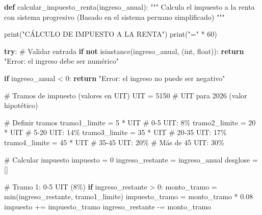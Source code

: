 \documentclass[
  doc,
  floatsintext,
  longtable,
  a4paper,
  nolmodern,
  notxfonts,
  notimes,
  12pt,
  colorlinks=true,linkcolor=blue,citecolor=blue,urlcolor=blue]{apa7}
\newenvironment{Shaded}{\begin{snugshade}}{\end{snugshade}}
\newcommand{\BuiltInTok}[1]{\textcolor[rgb]{0.00,0.23,0.31}{#1}}
\newcommand{\CommentTok}[1]{\textcolor[rgb]{0.37,0.37,0.37}{#1}}
\newcommand{\ControlFlowTok}[1]{\textcolor[rgb]{0.00,0.23,0.31}{\textbf{#1}}}
\newcommand{\DecValTok}[1]{\textcolor[rgb]{0.68,0.00,0.00}{#1}}
\newcommand{\FloatTok}[1]{\textcolor[rgb]{0.68,0.00,0.00}{#1}}
\newcommand{\KeywordTok}[1]{\textcolor[rgb]{0.00,0.23,0.31}{\textbf{#1}}}
\newcommand{\NormalTok}[1]{\textcolor[rgb]{0.00,0.23,0.31}{#1}}
\newcommand{\OperatorTok}[1]{\textcolor[rgb]{0.37,0.37,0.37}{#1}}
\newcommand{\StringTok}[1]{\textcolor[rgb]{0.13,0.47,0.30}{#1}}
\begin{document}
\begin{Shaded}
\begin{Highlighting}[]
\KeywordTok{def}\NormalTok{ calcular\_impuesto\_renta(ingreso\_anual):}
    \CommentTok{"""}
\CommentTok{    Calcula el impuesto a la renta con sistema progresivo}
\CommentTok{    (Basado en el sistema peruano simplificado)}
\CommentTok{    """}
    
    \BuiltInTok{print}\NormalTok{(}\StringTok{"CÁLCULO DE IMPUESTO A LA RENTA"}\NormalTok{)}
    \BuiltInTok{print}\NormalTok{(}\StringTok{"="} \OperatorTok{*} \DecValTok{60}\NormalTok{)}
    
    \ControlFlowTok{try}\NormalTok{:}
        \CommentTok{\# Validar entrada}
        \ControlFlowTok{if} \KeywordTok{not} \BuiltInTok{isinstance}\NormalTok{(ingreso\_anual, (}\BuiltInTok{int}\NormalTok{, }\BuiltInTok{float}\NormalTok{)):}
            \ControlFlowTok{return} \StringTok{"Error: el ingreso debe ser numérico"}
        
        \ControlFlowTok{if}\NormalTok{ ingreso\_anual }\OperatorTok{\textless{}} \DecValTok{0}\NormalTok{:}
            \ControlFlowTok{return} \StringTok{"Error: el ingreso no puede ser negativo"}
        
        \CommentTok{\# Tramos de impuesto (valores en UIT)}
\NormalTok{        UIT }\OperatorTok{=} \DecValTok{5150}  \CommentTok{\# UIT para 2026 (valor hipotético)}
        
        \CommentTok{\# Definir tramos}
\NormalTok{        tramo1\_limite }\OperatorTok{=} \DecValTok{5} \OperatorTok{*}\NormalTok{ UIT      }\CommentTok{\# 0{-}5 UIT: 8\%}
\NormalTok{        tramo2\_limite }\OperatorTok{=} \DecValTok{20} \OperatorTok{*}\NormalTok{ UIT     }\CommentTok{\# 5{-}20 UIT: 14\%}
\NormalTok{        tramo3\_limite }\OperatorTok{=} \DecValTok{35} \OperatorTok{*}\NormalTok{ UIT     }\CommentTok{\# 20{-}35 UIT: 17\%}
\NormalTok{        tramo4\_limite }\OperatorTok{=} \DecValTok{45} \OperatorTok{*}\NormalTok{ UIT     }\CommentTok{\# 35{-}45 UIT: 20\%}
        \CommentTok{\# Más de 45 UIT: 30\%}
        
        \CommentTok{\# Calcular impuesto}
\NormalTok{        impuesto }\OperatorTok{=} \DecValTok{0}
\NormalTok{        ingreso\_restante }\OperatorTok{=}\NormalTok{ ingreso\_anual}
\NormalTok{        desglose }\OperatorTok{=}\NormalTok{ []}
        
        \CommentTok{\# Tramo 1: 0{-}5 UIT (8\%)}
        \ControlFlowTok{if}\NormalTok{ ingreso\_restante }\OperatorTok{\textgreater{}} \DecValTok{0}\NormalTok{:}
\NormalTok{            monto\_tramo }\OperatorTok{=} \BuiltInTok{min}\NormalTok{(ingreso\_restante, tramo1\_limite)}
\NormalTok{            impuesto\_tramo }\OperatorTok{=}\NormalTok{ monto\_tramo }\OperatorTok{*} \FloatTok{0.08}
\NormalTok{            impuesto }\OperatorTok{+=}\NormalTok{ impuesto\_tramo}
\NormalTok{            ingreso\_restante }\OperatorTok{{-}=}\NormalTok{ monto\_tramo}
            

\end{Highlighting}
\end{Shaded}
\end{document}
